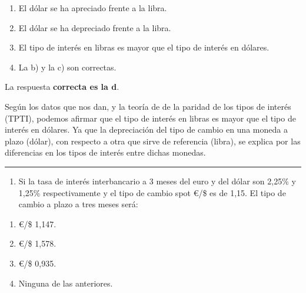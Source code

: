\documentclass[
  letterpaper,
  DIV=11,
  numbers=noendperiod]{scrreprt}
\providecommand{\tightlist}{%
  \setlength{\itemsep}{0pt}\setlength{\parskip}{0pt}}\usepackage{longtable,booktabs,array}
\begin{document}
\begin{enumerate}
\def\labelenumi{\alph{enumi})}
\item
  El dólar se ha apreciado frente a la libra.
\item
  El dólar se ha depreciado frente a la libra.
\item
  El tipo de interés en libras es mayor que el tipo de interés en
  dólares.
\item
  La b) y la c) son correctas.
\end{enumerate}

\begin{tcolorbox}[enhanced jigsaw, left=2mm, opacityback=0, colback=white, breakable, arc=.35mm, bottomrule=.15mm, rightrule=.15mm, toprule=.15mm, leftrule=.75mm, colframe=quarto-callout-tip-color-frame]
\begin{minipage}[t]{5.5mm}
\textcolor{quarto-callout-tip-color}{\faLightbulb}
\end{minipage}%
\begin{minipage}[t]{\textwidth - 5.5mm}

La respuesta \textbf{correcta es la d}.

Según los datos que nos dan, y la teoría de de la paridad de los tipos
de interés (TPTI), podemos afirmar que el tipo de interés en libras es
mayor que el tipo de interés en dólares. Ya que la depreciación del tipo
de cambio en una moneda a plazo (dólar), con respecto a otra que sirve
de referencia (libra), se explica por las diferencias en los tipos de
interés entre dichas monedas.

\end{minipage}%
\end{tcolorbox}

\begin{center}\rule{0.5\linewidth}{0.5pt}\end{center}

\begin{enumerate}
\def\labelenumi{\arabic{enumi}.}
\setcounter{enumi}{21}
\tightlist
\item
  Si la tasa de interés interbancario a 3 meses del euro y del dólar son
  2,25\% y 1,25\% respectivamente y el tipo de cambio spot €/\$ es de
  1,15. El tipo de cambio a plazo a tres meses será:
\end{enumerate}

\begin{enumerate}
\def\labelenumi{\alph{enumi})}
\item
  €/\$ 1,147.
\item
  €/\$ 1,578.
\item
  €/\$ 0,935.
\item
  Ninguna de las anteriores.
\end{enumerate}
\end{document}
